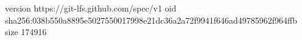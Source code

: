 version https://git-lfs.github.com/spec/v1
oid sha256:038b550a8895e5027550017998e21dc36a2a72f9941f646ad49785962f964ffb
size 174916
